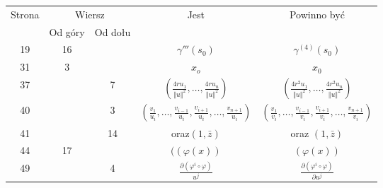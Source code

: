 \documentclass[a4paper,11pt]{article}
\numberwithin{equation}{section}
\begin{document}
\newpage



\begin{center}

  \begin{tabular}{|c|c|c|c|c|}
    \hline
    Strona & \multicolumn{2}{c|}{Wiersz} & Jest
                              & Powinno być \\ \cline{2-3}
    & Od góry & Od dołu & & \\
    \hline
    19  & 16 & & $\gamma'''( s_{ 0 } )$ & $\gamma^{ (4) }( s_{ 0 } )$ \\
    31  &  3 & & $x_{ o }$ & $x_{ 0 }$ \\
    37  & & 7 & $\left( \frac{ 4 r u_{ 1 } }{ \Vert u \Vert^{ 2 } }, \ldots,
                \frac{ 4 r u_{ n } }{ \Vert u \Vert^{ 2 } } \right)$
           & $\left( \frac{ 4 r^{ 2 } u_{ 1 } }{ \Vert u \Vert^{ 2 } },
             \ldots, \frac{ 4 r^{ 2 } u_{ n } }{ \Vert u \Vert^{ 2 } }
             \right)$ \\
    40  & &  3 & $( \frac { v_{ 1 } }{ u_{ i } }, \ldots,
                 \frac{ v_{ i - 1 } }{ u_{ i } },
                 \frac{ v_{ i + 1 } }{ u_{ i } }, \ldots,
                 \frac{ v_{ n + 1 } }{ u_{ i } } )$
           & $( \frac{ v_{ 1 } }{ v_{ i } }, \ldots,
             \frac{ v_{ i - 1 } }{ v_{ i } },
             \frac{ v_{ i + 1 } }{ v_{ i } }, \ldots,
             \frac{ v_{ n + 1 } }{ v_{ i } } )$ \\
    41  & & 14 & oraz$( 1, \bar{ z } )$ & oraz $( 1, \bar{ z } )$ \\
    44  & 17 & & $( ( \varphi( x ) )$ & $( \varphi( x ) )$ \\
    49  & &  4 & $\frac{ \partial ( \varphi^{ i } \circ \varphi ) }{ u^{ j } }$
           & $\frac{ \partial ( \varphi^{ i } \circ \varphi ) }{ \partial u^{ j } }$ \\
    \hline
  \end{tabular}

\end{center}

\VerSpaceTwo





\end{document}
